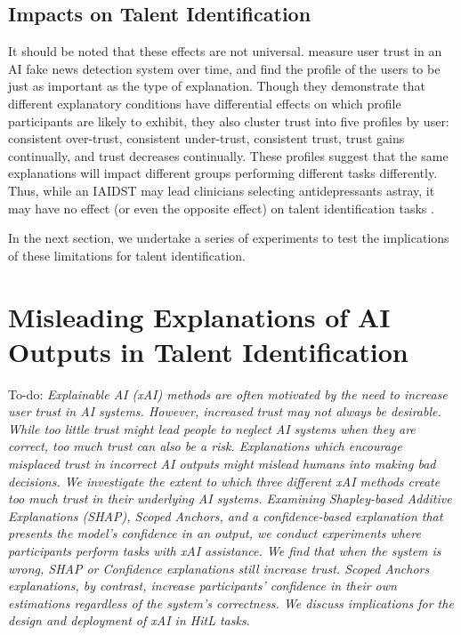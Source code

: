 \subsection{Impacts on Talent Identification}
It should be noted that these effects are not universal. \textcite{mohseni_trust_nodate} measure user trust in an AI fake news detection system over time, and find the profile of the users to be just as important as the type of explanation. Though they demonstrate that different explanatory conditions have differential effects on which profile participants are likely to exhibit, they also cluster trust into five profiles by user: consistent over-trust, consistent under-trust, consistent trust, trust gains continually, and trust decreases continually. These profiles suggest that the same explanations will impact different groups performing different tasks differently. Thus, while an IAIDST may lead clinicians selecting antidepressants astray, it may have no effect (or even the opposite effect) on talent identification tasks \cite{mohseni_trust_nodate}.

In the next section, we undertake a series of experiments to test the implications of these limitations for talent identification.

\section{Misleading Explanations of AI Outputs in Talent Identification}
To-do: \emph{Explainable AI (xAI) methods are often motivated by the need to increase user trust in AI systems. However, increased trust may not always be desirable. While too little trust might lead people to neglect AI systems when they are correct, too much trust can also be a risk. Explanations which encourage misplaced trust in incorrect AI outputs might mislead humans into making bad decisions. We investigate the extent to which three different xAI methods create too much trust in their underlying AI systems. Examining Shapley-based Additive Explanations (SHAP), Scoped Anchors, and a confidence-based explanation that presents the model's confidence in an output, we conduct experiments where participants perform tasks with xAI assistance. We find that when the system is wrong, SHAP or Confidence explanations still increase trust. Scoped Anchors explanations, by contrast, increase participants' confidence in their own estimations regardless of the system's correctness. We discuss implications for the design and deployment of xAI in HitL tasks.}

